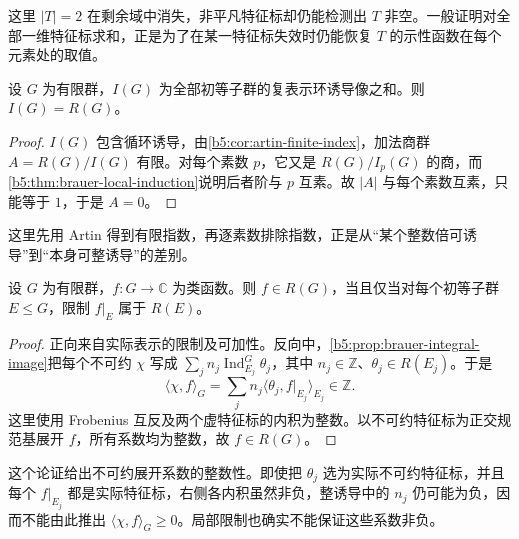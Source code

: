 这里 \(|T|=2\) 在剩余域中消失，非平凡特征标却仍能检测出 \(T\) 非空。一般证明对全部一维特征标求和，正是为了在某一特征标失效时仍能恢复 \(T\) 的示性函数在每个元素处的取值。

\begin{proposition}\label{b5:prop:brauer-integral-image}
	设 \(G\) 为有限群，\(I(G)\) 为全部初等子群的复表示环诱导像之和。则 \(I(G)=R(G)\)。
\end{proposition}
\begin{proof}
	\(I(G)\) 包含循环诱导，由\cref{b5:cor:artin-finite-index}，加法商群 \(A=R(G)/I(G)\) 有限。对每个素数 \(p\)，它又是 \(R(G)/I_p(G)\) 的商，而\cref{b5:thm:brauer-local-induction}说明后者阶与 \(p\) 互素。故 \(|A|\) 与每个素数互素，只能等于 \(1\)，于是 \(A=0\)。
\end{proof}

这里先用 Artin 得到有限指数，再逐素数排除指数，正是从“某个整数倍可诱导”到“本身可整诱导”的差别。

\begin{corollary}[初等子群上的虚特征标判据]\label{b5:cor:brauer-character-criterion}
	设 \(G\) 为有限群，\(f:G\rightarrow\mathbb C\) 为类函数。则 \(f\in R(G)\)，当且仅当对每个初等子群 \(E\le G\)，限制 \(f|_E\) 属于 \(R(E)\)。
\end{corollary}
\begin{proof}
	正向来自实际表示的限制及可加性。反向中，\cref{b5:prop:brauer-integral-image}把每个不可约 \(\chi\) 写成 \(\sum_j n_j\operatorname{Ind}_{E_j}^G\theta_j\)，其中 \(n_j\in\mathbb Z\)、\(\theta_j\in R(E_j)\)。于是
	\[
		\langle\chi,f\rangle_G =\sum_j n_j\langle\theta_j,f|_{E_j}\rangle_{E_j}\in\mathbb Z.
	\]
	这里使用 Frobenius 互反及两个虚特征标的内积为整数。以不可约特征标为正交规范基展开 \(f\)，所有系数均为整数，故 \(f\in R(G)\)。
\end{proof}

这个论证给出不可约展开系数的整数性。即使把 \(\theta_j\) 选为实际不可约特征标，并且每个 \(f|_{E_j}\) 都是实际特征标，右侧各内积虽然非负，整诱导中的 \(n_j\) 仍可能为负，因而不能由此推出 \(\langle\chi,f\rangle_G\ge0\)。局部限制也确实不能保证这些系数非负。

